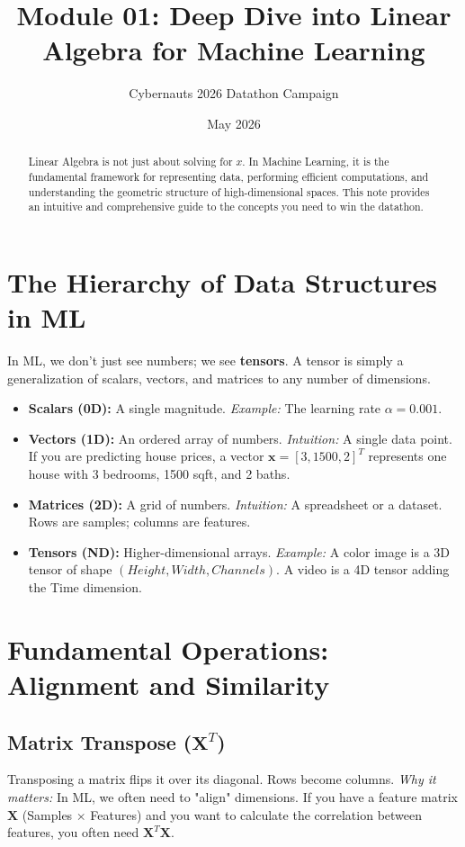 \documentclass{article}
\title{Module 01: Deep Dive into Linear Algebra for Machine Learning}
\author{Cybernauts 2026 Datathon Campaign}
\date{May 2026}
\begin{document}
\maketitle

\begin{abstract}
Linear Algebra is not just about solving for $x$. In Machine Learning, it is the fundamental framework for representing data, performing efficient computations, and understanding the geometric structure of high-dimensional spaces. This note provides an intuitive and comprehensive guide to the concepts you need to win the datathon.
\end{abstract}

\tableofcontents
\newpage

\section{The Hierarchy of Data Structures in ML}
In ML, we don't just see numbers; we see \textbf{tensors}. A tensor is simply a generalization of scalars, vectors, and matrices to any number of dimensions.

\begin{itemize}
    \item \textbf{Scalars (0D):} A single magnitude. 
    \textit{Example:} The learning rate $\alpha = 0.001$.
    \item \textbf{Vectors (1D):} An ordered array of numbers. 
    \textit{Intuition:} A single data point. If you are predicting house prices, a vector $\mathbf{x} = [3, 1500, 2]^T$ represents one house with 3 bedrooms, 1500 sqft, and 2 baths.
    \item \textbf{Matrices (2D):} A grid of numbers. 
    \textit{Intuition:} A spreadsheet or a dataset. Rows are samples; columns are features. 
    \item \textbf{Tensors (ND):} Higher-dimensional arrays. 
    \textit{Example:} A color image is a 3D tensor of shape $(Height, Width, Channels)$. A video is a 4D tensor adding the Time dimension.
\end{itemize}

\section{Fundamental Operations: Alignment and Similarity}

\subsection{Matrix Transpose ($\mathbf{X}^T$)}
Transposing a matrix flips it over its diagonal. Rows become columns.
\textit{Why it matters:} In ML, we often need to "align" dimensions. If you have a feature matrix $\mathbf{X}$ (Samples $\times$ Features) and you want to calculate the correlation between features, you often need $\mathbf{X}^T\mathbf{X}$.
\end{document}
